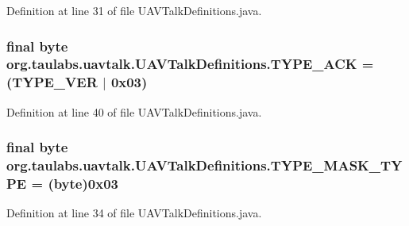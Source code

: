 Definition at line 31 of file U\-A\-V\-Talk\-Definitions.\-java.

\hypertarget{classorg_1_1taulabs_1_1uavtalk_1_1_u_a_v_talk_definitions_a2108eedbfe1b9c6fd6dbc497282b444c}{
\subsubsection[{T\-Y\-P\-E\-\_\-\-A\-C\-K}]{\setlength{\rightskip}{0pt plus 5cm}final byte org.\-taulabs.\-uavtalk.\-U\-A\-V\-Talk\-Definitions.\-T\-Y\-P\-E\-\_\-\-A\-C\-K = ({\bf T\-Y\-P\-E\-\_\-\-V\-E\-R} $|$ 0x03)\hspace{0.3cm}{\ttfamily [static]}}}\label{classorg_1_1taulabs_1_1uavtalk_1_1_u_a_v_talk_definitions_a2108eedbfe1b9c6fd6dbc497282b444c}


Definition at line 40 of file U\-A\-V\-Talk\-Definitions.\-java.

\hypertarget{classorg_1_1taulabs_1_1uavtalk_1_1_u_a_v_talk_definitions_a6ccf2b527d322fdf522976dfcdae2054}{
\subsubsection[{T\-Y\-P\-E\-\_\-\-M\-A\-S\-K\-\_\-\-T\-Y\-P\-E}]{\setlength{\rightskip}{0pt plus 5cm}final byte org.\-taulabs.\-uavtalk.\-U\-A\-V\-Talk\-Definitions.\-T\-Y\-P\-E\-\_\-\-M\-A\-S\-K\-\_\-\-T\-Y\-P\-E = (byte)0x03\hspace{0.3cm}{\ttfamily [static]}}}\label{classorg_1_1taulabs_1_1uavtalk_1_1_u_a_v_talk_definitions_a6ccf2b527d322fdf522976dfcdae2054}


Definition at line 34 of file U\-A\-V\-Talk\-Definitions.\-java.

